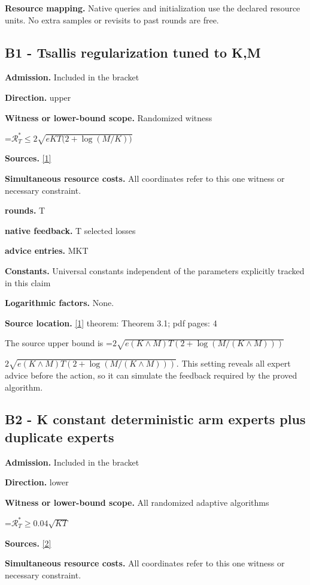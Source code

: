 \documentclass[10pt,a4paper]{article}
\newcommand{\AtlasMath}[1]{\par\begingroup\centering\setbox0=\hbox{$\displaystyle #1$}\ifdim\wd0>1.4\linewidth\typeout{ATLAS WIDE FORMULA: \the\wd0}\fi\ifdim\wd0>\linewidth\resizebox{\linewidth}{!}{\box0}\else\box0\fi\par\endgroup}
\newcommand{\AtlasInlineMath}[1]{\begingroup\setbox0=\hbox{$#1$}\ifdim\wd0>.4\linewidth\endgroup\AtlasMath{#1}\else\endgroup$#1$\fi}
\begin{document}
\textbf{Resource mapping.} Native queries and initialization use the declared resource units. No extra samples or revisits to past rounds are free.

\subsection{B1 - Tsallis regularization tuned to K,M}
\textbf{Admission.} Included in the bracket

\textbf{Direction.} upper

\textbf{Witness or lower-bound scope.} Randomized witness

\AtlasMath{\mathcal{R}_T^*\le2\sqrt{eKT\bigl(2+\log(M/K)\bigr)}}
\textbf{Sources.} \href{https://arxiv.org/pdf/2406.16802v1}{[1]}

\textbf{Simultaneous resource costs.} All coordinates refer to this one witness or necessary constraint.

\textbf{rounds.} T

\textbf{native feedback.} T selected losses

\textbf{advice entries.} MKT

\textbf{Constants.} Universal constants independent of the parameters explicitly tracked in this claim

\textbf{Logarithmic factors.} None.

\textbf{Source location.} \href{https://arxiv.org/pdf/2406.16802v1}{[1]} theorem: Theorem 3.1; pdf pages: 4

The source upper bound is \AtlasInlineMath{2\sqrt{e(K\wedge M)T(2+\log(M/(K\wedge M)))}}. This setting reveals all expert advice before the action, so it can simulate the feedback required by the proved algorithm.

\subsection{B2 - K constant deterministic arm experts plus duplicate experts}
\textbf{Admission.} Included in the bracket

\textbf{Direction.} lower

\textbf{Witness or lower-bound scope.} All randomized adaptive algorithms

\AtlasMath{\mathcal{R}_T^*\ge0.04\sqrt{KT}}
\textbf{Sources.} \href{https://jmlr.org/papers/volume11/audibert10a/audibert10a.pdf}{[2]}

\textbf{Simultaneous resource costs.} All coordinates refer to this one witness or necessary constraint.
\end{document}
